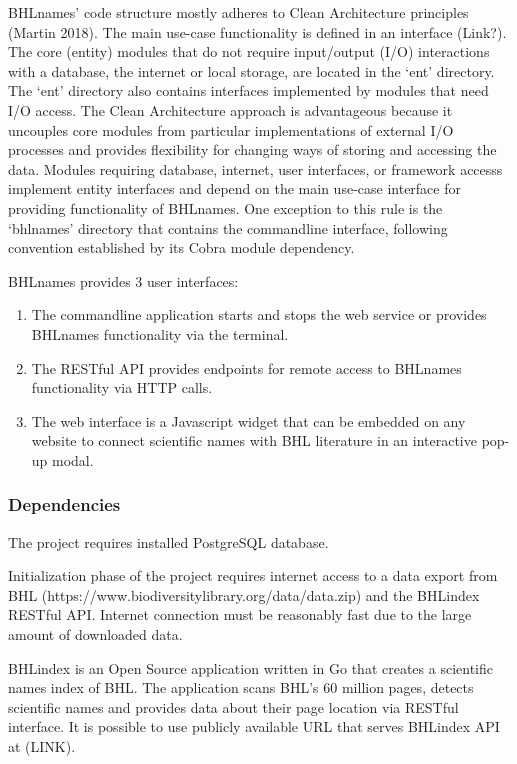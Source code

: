 \documentclass[
]{article}
\begin{document}
BHLnames' code structure mostly adheres to Clean Architecture principles
(Martin 2018). The main use-case functionality is defined in an
interface (Link?). The core (entity) modules that do not require
input/output (I/O) interactions with a database, the internet or local
storage, are located in the `ent' directory. The `ent' directory also
contains interfaces implemented by modules that need I/O access. The
Clean Architecture approach is advantageous because it uncouples core
modules from particular implementations of external I/O processes and
provides flexibility for changing ways of storing and accessing the
data. Modules requiring database, internet, user interfaces, or
framework accesss implement entity interfaces and depend on the main
use-case interface for providing functionality of BHLnames. One
exception to this rule is the `bhlnames' directory that contains the
commandline interface, following convention established by its Cobra
module dependency.

BHLnames provides 3 user interfaces:

\begin{enumerate}
\def\labelenumi{\arabic{enumi}.}
\item
  The commandline application starts and stops the web service or
  provides BHLnames functionality via the terminal.
\item
  The RESTful API provides endpoints for remote access to BHLnames
  functionality via HTTP calls.
\item
  The web interface is a Javascript widget that can be embedded on any
  website to connect scientific names with BHL literature in an
  interactive pop-up modal.
\end{enumerate}

\hypertarget{dependencies}{%
\subsubsection{Dependencies}\label{dependencies}}

The project requires installed PostgreSQL database.

Initialization phase of the project requires internet access to a data
export from BHL (https://www.biodiversitylibrary.org/data/data.zip) and
the BHLindex RESTful API. Internet connection must be reasonably fast
due to the large amount of downloaded data.

BHLindex is an Open Source application written in Go that creates a
scientific names index of BHL. The application scans BHL's 60 million
pages, detects scientific names and provides data about their page
location via RESTful interface. It is possible to use publicly available
URL that serves BHLindex API at (LINK).
\end{document}
